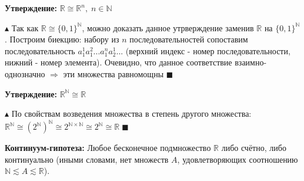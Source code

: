 \par \textbf{Утверждение:} $\mathbb{R} \cong \mathbb{R}^n, \; n \in \mathbb{N}$
\par $\blacktriangle$ Так как $\mathbb{R} \cong \{0, 1\}^{\mathbb{N}}$, можно доказать данное утрверждение заменив $\mathbb{R}$ на $\{0, 1\}^{\mathbb{N}}$. Построим биекцию: набору из $n$ последовательностей сопоставим последовательность $a_1^1 a_1^2...a_1^n a_2^1 ...$ (верхний индекс - номер последовательности, нижний - номер элемента). Очевидно, что данное соответствие взаимно-однозначно $\Rightarrow$ эти множества равномощны $\blacksquare$
\par \textbf{Утверждение:} $\mathbb{R}^{\mathbb{N}} \cong \mathbb{R}$
\par $\blacktriangle$ По свойствам возведения множества в степень другого множества:
$\mathbb{R}^{\mathbb{N}} \cong (2^{\mathbb{N}})^{\mathbb{N}} \cong 2^{\mathbb{N} \times \mathbb{N}} \cong 2^{\mathbb{N}} \cong \mathbb{R} \; \blacksquare$
\par \textbf{Континуум-гипотеза: } Любое бесконечное подмножество
$\mathbb{R}$ либо счётно, либо континуально (иными словами, нет множеств $A$, удовлетворяющих соотношению $\mathbb{N} \lesssim A \lesssim \mathbb{R}$).